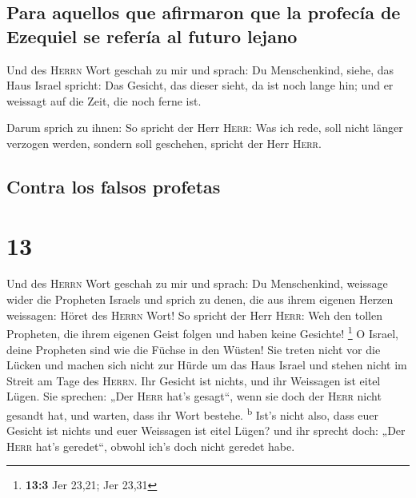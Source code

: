 \hypertarget{para-aquellos-que-afirmaron-que-la-profecuxeda-de-ezequiel-se-referuxeda-al-futuro-lejano}{%
\subsection{Para aquellos que afirmaron que la profecía de Ezequiel se
refería al futuro
lejano}\label{para-aquellos-que-afirmaron-que-la-profecuxeda-de-ezequiel-se-referuxeda-al-futuro-lejano}}

 Und des \textsc{Herrn} Wort geschah zu mir und sprach:
 Du Menschenkind, siehe, das Haus Israel spricht: Das
Gesicht, das dieser sieht, da ist noch lange hin; und er weissagt auf
die Zeit, die noch ferne ist.

 Darum sprich zu ihnen: So spricht der Herr
\textsc{Herr}: Was ich rede, soll nicht länger verzogen werden, sondern
soll geschehen, spricht der Herr \textsc{Herr}.

\hypertarget{contra-los-falsos-profetas}{%
\subsection{Contra los falsos
profetas}\label{contra-los-falsos-profetas}}

\hypertarget{section-12}{%
\section{13}\label{section-12}}

 Und des \textsc{Herrn} Wort geschah zu mir und sprach:
 Du Menschenkind, weissage wider die Propheten Israels und
sprich zu denen, die aus ihrem eigenen Herzen weissagen: Höret des
\textsc{Herrn} Wort!  So spricht der Herr \textsc{Herr}:
Weh den tollen Propheten, die ihrem eigenen Geist folgen und haben keine
Gesichte! \footnote{\textbf{13:3} Jer 23,21; Jer 23,31}  O
Israel, deine Propheten sind wie die Füchse in den Wüsten!
 Sie treten nicht vor die Lücken und machen sich nicht zur
Hürde um das Haus Israel und stehen nicht im Streit am Tage des
\textsc{Herrn}.  Ihr Gesicht ist nichts, und ihr Weissagen
ist eitel Lügen. Sie sprechen: „Der \textsc{Herr} hat's gesagt``, wenn
sie doch der \textsc{Herr} nicht gesandt hat, und warten, dass ihr Wort
bestehe. \textsuperscript{b}  Ist's nicht also, dass euer
Gesicht ist nichts und euer Weissagen ist eitel Lügen? und ihr sprecht
doch: „Der \textsc{Herr} hat's geredet``, obwohl ich's doch nicht
geredet habe.

